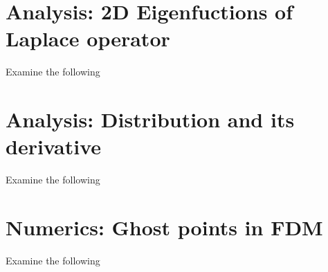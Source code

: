\documentclass[12pt]{article}
\begin{document}
\newpage
\section{Analysis: 2D Eigenfuctions of Laplace operator}
\begin{example}
	\label{ex:example1}
	Examine the following
\end{example}

\newpage
\section{Analysis: Distribution and its derivative}
\begin{example}
	\label{ex:example1}
	Examine the following
\end{example}

\newpage
\section{Numerics: Ghost points in FDM}
\begin{example}
	Examine the following
\end{example}
\end{document}
